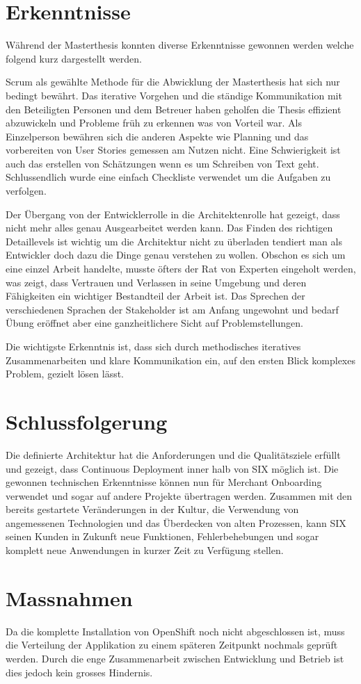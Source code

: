 \chapter{Erkenntnisse}

Während der Masterthesis konnten diverse Erkenntnisse gewonnen werden welche folgend kurz dargestellt werden.\newline\newline

Scrum als gewählte Methode für die Abwicklung der Masterthesis hat sich nur bedingt bewährt. Das iterative Vorgehen und die ständige Kommunikation mit den Beteiligten Personen und dem Betreuer haben geholfen die Thesis effizient abzuwickeln und Probleme früh zu erkennen was von Vorteil war. Als Einzelperson bewähren sich die anderen Aspekte wie Planning und das vorbereiten von User Stories gemessen am Nutzen nicht. Eine Schwierigkeit ist auch das erstellen von Schätzungen wenn es um Schreiben von Text geht. Schlussendlich wurde eine einfach Checkliste verwendet um die Aufgaben zu verfolgen.\newline\newline

Der Übergang von der Entwicklerrolle in die Architektenrolle hat gezeigt, dass nicht mehr alles genau Ausgearbeitet werden kann. Das Finden des richtigen Detaillevels ist wichtig um die Architektur nicht zu überladen tendiert man als Entwickler doch dazu die Dinge genau verstehen zu wollen. Obschon es sich um eine einzel Arbeit handelte, musste öfters der Rat von Experten eingeholt werden, was zeigt, dass Vertrauen und Verlassen in seine Umgebung und deren Fähigkeiten ein wichtiger Bestandteil der Arbeit ist. Das Sprechen der verschiedenen Sprachen der Stakeholder ist am Anfang ungewohnt und bedarf Übung eröffnet aber eine ganzheitlichere Sicht auf Problemstellungen.\newline\newline

Die wichtigste Erkenntnis ist, dass sich durch methodisches iteratives Zusammenarbeiten und klare Kommunikation ein, auf den ersten Blick komplexes Problem, gezielt lösen lässt.

\chapter{Schlussfolgerung}

Die definierte Architektur hat die Anforderungen und die Qualitätsziele erfüllt und gezeigt, dass Continuous Deployment inner halb von SIX möglich ist. Die gewonnen technischen Erkenntnisse können nun für Merchant Onboarding verwendet und sogar auf andere Projekte übertragen werden. Zusammen mit den bereits gestartete Veränderungen in der Kultur, die Verwendung von angemessenen Technologien und das Überdecken von alten Prozessen, kann SIX seinen Kunden in Zukunft neue Funktionen, Fehlerbehebungen und sogar komplett neue Anwendungen in kurzer Zeit zu Verfügung stellen.

\chapter{Massnahmen}

Da die komplette Installation von OpenShift noch nicht abgeschlossen ist, muss die Verteilung der Applikation zu einem späteren Zeitpunkt nochmals geprüft werden. Durch die enge Zusammenarbeit zwischen Entwicklung und Betrieb ist dies jedoch kein grosses Hindernis.